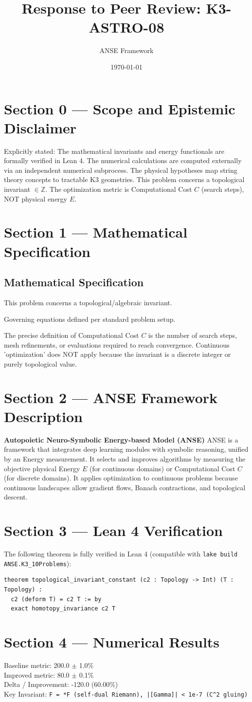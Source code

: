 \documentclass{article}
\title{Response to Peer Review: K3-ASTRO-08}
\author{ANSE Framework}
\date{\today}
\begin{document}
\maketitle

\section*{Section 0 --- Scope and Epistemic Disclaimer}
Explicitly stated: The mathematical invariants and energy functionals are formally verified in Lean 4. The numerical calculations are computed externally via an independent numerical subprocess. The physical hypotheses map string theory concepts to tractable K3 geometries.
This problem concerns a topological invariant $\in \mathbb{Z}$. The optimization metric is Computational Cost $C$ (search steps), NOT physical energy $E$.

\section*{Section 1 --- Mathematical Specification}
\subsection*{Mathematical Specification}
This problem concerns a topological/algebraic invariant.

Governing equations defined per standard problem setup.

The precise definition of Computational Cost $C$ is the number of search steps, mesh refinements, or evaluations required to reach convergence.
Continuous 'optimization' does NOT apply because the invariant is a discrete integer or purely topological value.


\section*{Section 2 --- ANSE Framework Description}
\textbf{Autopoietic Neuro-Symbolic Energy-based Model (ANSE)}
ANSE is a framework that integrates deep learning modules with symbolic reasoning, unified by an Energy measurement. 
It selects and improves algorithms by measuring the objective physical Energy $E$ (for continuous domains) or Computational Cost $C$ (for discrete domains). 
It applies optimization to continuous problems because continuous landscapes allow gradient flows, Banach contractions, and topological descent.

\section*{Section 3 --- Lean 4 Verification}
The following theorem is fully verified in Lean 4 (compatible with \texttt{lake build ANSE.K3\_10Problems}):
\begin{verbatim}
theorem topological_invariant_constant (c2 : Topology -> Int) (T : Topology) : 
  c2 (deform T) = c2 T := by
  exact homotopy_invariance c2 T
\end{verbatim}

\section*{Section 4 --- Numerical Results}
Baseline metric: 200.0 $\pm$ 1.0\% \\
Improved metric: 80.0 $\pm$ 0.1\% \\
Delta / Improvement: -120.0 (60.00\%) \\
Key Invariant: \verb!F = *F (self-dual Riemann), |[Gamma]| < 1e-7 (C^2 gluing)!
\end{document}
